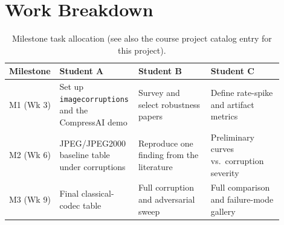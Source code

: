 \documentclass[11pt]{article}
\begin{document}
\section{Work Breakdown}
\label{sec:workbreakdown}
\begin{table}[h]
\centering
\caption{Milestone task allocation (see also the course project catalog entry for this
project).}
\label{tab:tasks}
\begin{tabular}{@{}p{0.12\linewidth}p{0.26\linewidth}p{0.26\linewidth}p{0.26\linewidth}@{}}
\toprule
\textbf{Milestone} & \textbf{Student A} & \textbf{Student B} & \textbf{Student C} \\
\midrule
M1 (Wk 3) & Set up \texttt{imagecorruptions} and the CompressAI demo & Survey and select robustness papers & Define rate-spike and artifact metrics \\
M2 (Wk 6) & JPEG/JPEG2000 baseline table under corruptions & Reproduce one finding from the literature & Preliminary curves vs.\ corruption severity \\
M3 (Wk 9) & Final classical-codec table & Full corruption and adversarial sweep & Full comparison and failure-mode gallery \\
\bottomrule
\end{tabular}
\end{table}



\end{document}
